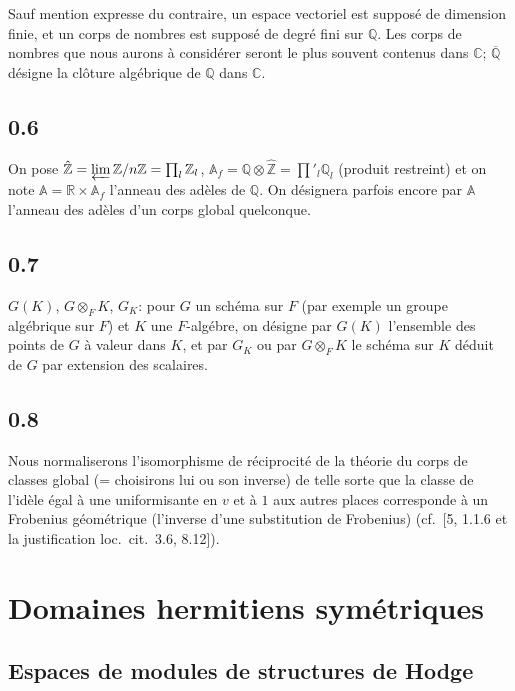 \documentclass[12pt,a4paper]{article}
\theoremstyle{plain}
\theoremstyle{definition}
\theoremstyle{remark}
\newcommand{\ZZ}{\mathbb{Z}}
\newcommand{\QQ}{\mathbb{Q}}
\newcommand{\RR}{\mathbb{R}}
\newcommand{\CC}{\mathbb{C}}
\newcommand{\Af}{\mathbb{A}_f}
\newcommand{\A}{\mathbb{A}}
\begin{document}
Sauf mention expresse du contraire, un espace vectoriel est suppos\'e de dimension finie, et un corps de nombres est suppos\'e de degr\'e fini sur $\QQ$. Les corps de nombres que nous aurons \`a consid\'erer seront le plus souvent contenus dans $\CC$; $\overline{\QQ}$ d\'esigne la cl\^oture alg\'ebrique de $\QQ$ dans $\CC$.

\subsection*{0.6}

On pose $\hat{\ZZ} = \varprojlim \ZZ/n\ZZ = \prod_l \ZZ_l$, $\Af = \QQ \otimes \hat{\ZZ} = {\prod}'_l \QQ_l$ (produit restreint) et on note $\A = \RR \times \Af$ l'anneau des ad\`eles de $\QQ$. On d\'esignera parfois encore par $\A$ l'anneau des ad\`eles d'un corps global quelconque.

\subsection*{0.7}

$G(K)$, $G \otimes_F K$, $G_K$: pour $G$ un sch\'ema sur $F$ (par exemple un groupe alg\'ebrique sur $F$) et $K$ une $F$-alg\'ebre, on d\'esigne par $G(K)$ l'ensemble des points de $G$ \`a valeur dans $K$, et par $G_K$ ou par $G \otimes_F K$ le sch\'ema sur $K$ d\'eduit de $G$ par extension des scalaires.

\subsection*{0.8}

Nous normaliserons l'isomorphisme de r\'eciprocit\'e de la th\'eorie du corps de classes global (= choisirons lui ou son inverse) de telle sorte que la classe de l'id\`ele \'egal \`a une uniformisante en $v$ et \`a $1$ aux autres places corresponde \`a un Frobenius g\'eom\'etrique (l'inverse d'une substitution de Frobenius) (cf.~[5, 1.1.6 et la justification loc.~cit.~3.6, 8.12]).

\section{Domaines hermitiens sym\'etriques}

\subsection{Espaces de modules de structures de Hodge}
\end{document}
